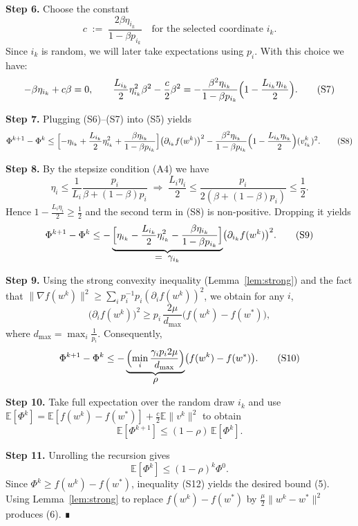 \documentclass[11pt]{article}
\newcommand{\E}{\mathbb{E}}
\begin{document}
\noindent\textbf{Step 6.} Choose the constant
\[
c \;:=\; \frac{2\beta\eta_{i_k}}{1-\beta p_{i_k}}
\quad\text{for the selected coordinate }i_k. \tag{S6}
\]
Since $i_k$ is random, we will later take expectations using $p_i$.
With this choice we have:
\[
-\beta\eta_{i_k}+c\beta=0, \qquad
\frac{L_{i_k}}{2}\eta_{i_k}^{2}\beta^{2}
   -\frac{c}{2}\beta^{2}
   =-\frac{\beta^{2}\eta_{i_k}}{1-\beta p_{i_k}}
     \Bigl(1-\frac{L_{i_k}\eta_{i_k}}{2}\Bigr). \tag{S7}
\]

\noindent\textbf{Step 7.} Plugging (S6)–(S7) into (S5) yields
\[
\Phi^{k+1}-\Phi^{k}
\le
\Bigl[-\eta_{i_k}+ \frac{L_{i_k}}{2}\eta_{i_k}^{2}
       +\frac{\beta\eta_{i_k}}{1-\beta p_{i_k}}\Bigr]
       \bigl(\partial_{i_k}f(w^{k})\bigr)^{2}
       -\frac{\beta^{2}\eta_{i_k}}{1-\beta p_{i_k}}
         \Bigl(1-\frac{L_{i_k}\eta_{i_k}}{2}\Bigr)
         (v^{k}_{i_k})^{2}. \tag{S8}
\]

\noindent\textbf{Step 8.} By the stepsize condition (A4) we have
\[
\eta_{i}\le \frac{1}{L_i}\frac{p_i}{\beta+(1-\beta)p_i}
\;\Longrightarrow\;
\frac{L_i\eta_i}{2}\le\frac{p_i}{2(\beta+(1-\beta)p_i)}\le\frac12 .
\]
Hence $1-\frac{L_i\eta_i}{2}\ge\frac12$ and the second term in (S8) is
non‑positive.  Dropping it yields
\[
\Phi^{k+1}-\Phi^{k}
\le
-\underbrace{\Bigl[\eta_{i_k}
      -\frac{L_{i_k}}{2}\eta_{i_k}^{2}
      -\frac{\beta\eta_{i_k}}{1-\beta p_{i_k}}\Bigr]}_{\displaystyle
      =\; \gamma_{i_k}}
      \bigl(\partial_{i_k}f(w^{k})\bigr)^{2}. \tag{S9}
\]

\noindent\textbf{Step 9.} Using the strong convexity inequality
(Lemma~\ref{lem:strong}) and the fact that
$\|\nabla f(w^{k})\|^{2}
\ge \sum_{i}p_i^{-1}p_i(\partial_i f(w^{k}))^{2}$,
we obtain for any $i$,
\[
\bigl(\partial_i f(w^{k})\bigr)^{2}
\ge p_i\,\frac{2\mu}{d_{\max}}\bigl(f(w^{k})-f(w^{*})\bigr),
\]
where $d_{\max}= \max_i \frac{1}{p_i}$.
Consequently,
\[
\Phi^{k+1}-\Phi^{k}
\le -\underbrace{\Bigl(\min_i\frac{\gamma_i p_i 2\mu}{d_{\max}}\Bigr)}_{\displaystyle\rho}
      \bigl(f(w^{k})-f(w^{*})\bigr). \tag{S10}
\]

\noindent\textbf{Step 10.} Take full expectation over the random draw
$i_k$ and use $\E[\Phi^{k}]=\E[f(w^{k})-f(w^{*})]+\frac{c}{2}\E\|v^{k}\|^{2}$
to obtain
\[
\E\!\left[\Phi^{k+1}\right]
\le (1-\rho)\,\E\!\left[\Phi^{k}\right].
\tag{S11}
\]

\noindent\textbf{Step 11.} Unrolling the recursion gives
\[
\E\!\left[\Phi^{k}\right]\le (1-\rho)^{k}\Phi^{0}.
\tag{S12}
\]
Since $\Phi^{k}\ge f(w^{k})-f(w^{*})$, inequality (S12) yields the desired
bound (5).  Using Lemma~\ref{lem:strong} to replace $f(w^{k})-f(w^{*})$
by $\frac{\mu}{2}\|w^{k}-w^{*}\|^{2}$ produces (6).  ∎
\end{document}
